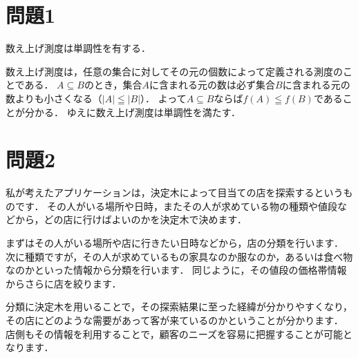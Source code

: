 \section*{問題1}
数え上げ測度は単調性を有する．

数え上げ測度は，任意の集合に対してその元の個数によって定義される測度のことである．
$A \subseteq B$のとき，集合$A$に含まれる元の数は必ず集合$B$に含まれる元の数よりも小さくなる（$|A| \leqq |B|$）．
よって$A \subseteq B$ならば$f(A) \leqq f(B)$であることが分かる．
ゆえに数え上げ測度は単調性を満たす．

\section*{問題2}
私が考えたアプリケーションは，決定木によって目当ての店を探索するというものです．
その人がいる場所や日時，またその人が求めている物の種類や値段などから，どの店に行けばよいのかを決定木で決めます．

まずはその人がいる場所や店に行きたい日時などから，店の分類を行います．
次に種類ですが，その人が求めているもの家具なのか服なのか，あるいは食べ物なのかといった情報から分類を行います．
同じように，その値段の価格帯情報からさらに店を絞ります．

分類に決定木を用いることで，その探索結果に至った経緯が分かりやすくなり，その店にどのような需要があって客が来ているのかということが分かります．
店側もその情報を利用することで，顧客のニーズを容易に把握することが可能となります．